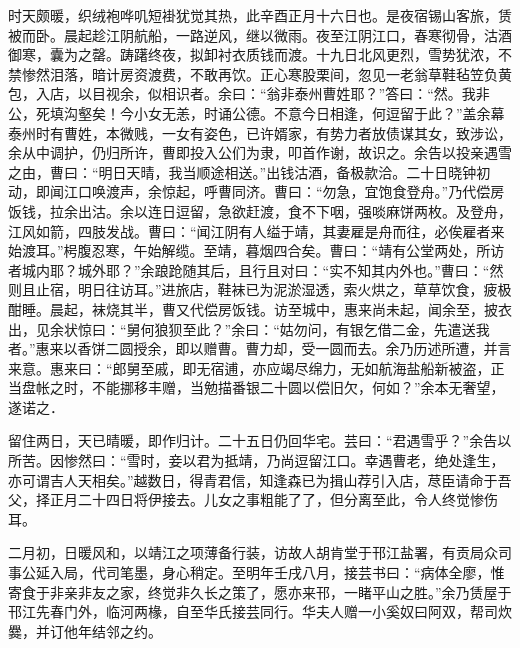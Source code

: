 \documentclass[]{article}
\begin{document}
时天颇暖，织绒袍哗叽短褂犹觉其热，此辛酉正月十六日也。是夜宿锡山客旅，赁被而卧。晨起趁江阴航船，一路逆风，继以微雨。夜至江阴江口，春寒彻骨，沽酒御寒，囊为之罄。踌躇终夜，拟卸衬衣质钱而渡。十九日北风更烈，雪势犹浓，不禁惨然泪落，暗计房资渡费，不敢再饮。正心寒股栗间，忽见一老翁草鞋毡笠负黄包，入店，以目视余，似相识者。余曰：``翁非泰州曹姓耶？''答曰：``然。我非公，死填沟壑矣！今小女无恙，时诵公德。不意今日相逢，何逗留于此？''盖余幕泰州时有曹姓，本微贱，一女有姿色，已许婿家，有势力者放债谋其女，致涉讼，余从中调护，仍归所许，曹即投入公们为隶，叩首作谢，故识之。余告以投亲遇雪之由，曹曰：``明日天晴，我当顺途相送。''出钱沽酒，备极款洽。二十日晓钟初动，即闻江口唤渡声，余惊起，呼曹同济。曹曰：``勿急，宜饱食登舟。''乃代偿房饭钱，拉余出沽。余以连日逗留，急欲赶渡，食不下咽，强啖麻饼两枚。及登舟，江风如箭，四肢发战。曹曰：``闻江阴有人缢于靖，其妻雇是舟而往，必俟雇者来始渡耳。''枵腹忍寒，午始解缆。至靖，暮烟四合矣。曹曰：``靖有公堂两处，所访者城内耶？城外耶？''余踉跄随其后，且行且对曰：``实不知其内外也。''曹曰：``然则且止宿，明日往访耳。''进旅店，鞋袜已为泥淤湿透，索火烘之，草草饮食，疲极酣睡。晨起，袜烧其半，曹又代偿房饭钱。访至城中，惠来尚未起，闻余至，披衣出，见余状惊曰：``舅何狼狈至此？''余曰：``姑勿问，有银乞借二金，先遣送我者。''惠来以香饼二圆授余，即以赠曹。曹力却，受一圆而去。余乃历述所遭，并言来意。惠来曰：``郎舅至戚，即无宿逋，亦应竭尽绵力，无如航海盐船新被盗，正当盘帐之时，不能挪移丰赠，当勉描番银二十圆以偿旧欠，何如？''余本无奢望，遂诺之．

留住两日，天已晴暖，即作归计。二十五日仍回华宅。芸曰：``君遇雪乎？''余告以所苦。因惨然曰：``雪时，妾以君为抵靖，乃尚逗留江口。幸遇曹老，绝处逢生，亦可谓吉人天相矣。''越数日，得青君信，知逢森已为揖山荐引入店，荩臣请命于吾父，择正月二十四日将伊接去。儿女之事粗能了了，但分离至此，令人终觉惨伤耳。

二月初，日暖风和，以靖江之项薄备行装，访故人胡肯堂于邗江盐署，有贡局众司事公延入局，代司笔墨，身心稍定。至明年壬戌八月，接芸书曰：``病体全廖，惟寄食于非亲非友之家，终觉非久长之策了，愿亦来邗，一睹平山之胜。''余乃赁屋于邗江先春门外，临河两椽，自至华氏接芸同行。华夫人赠一小奚奴曰阿双，帮司炊爨，并订他年结邻之约。
\end{document}
